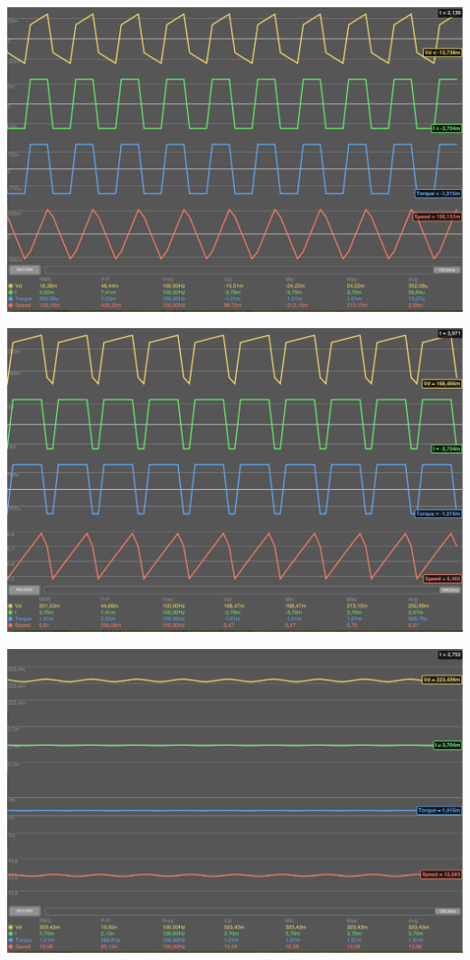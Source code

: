 \documentclass[a4paper]{article}
\begin{document}
\begin{center}
	\includegraphics[width=1\textwidth]{simu0v}
\end{center}
\begin{center}
	\includegraphics[width=1\textwidth]{simu7v}
\end{center}
\begin{center}
	\includegraphics[width=1\textwidth]{simu15v}
\end{center}
\end{document}
